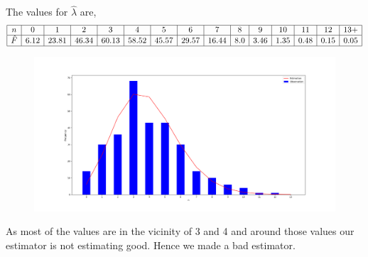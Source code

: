 \documentclass{article}
\theoremstyle{mytheoremstyle}
\theoremstyle{mytheoremstyle}
\theoremstyle{myproblemstyle}
\begin{document}
The values for \(\hat{\lambda}\) are,
\begin{equation*}
    \begin{array}{|c|c|c|c|c|c|c|c|c|c|c|c|c|c|c|}
        \hline
        n       & 0    & 1     & 2     & 3     & 4     & 5     & 6     & 7     & 8   & 9    & 10   & 11   & 12   & 13+  \\\hline
        \hat{F} & 6.12 & 23.81 & 46.34 & 60.13 & 58.52 & 45.57 & 29.57 & 16.44 & 8.0 & 3.46 & 1.35 & 0.48 & 0.15 & 0.05 \\\hline
    \end{array}
\end{equation*}
\begin{figure}[h]
    \center
    \includegraphics[width=\textwidth]{fig.png}
\end{figure}

As most of the values are in the vicinity of 3 and 4 and around those values our estimator is not estimating good. Hence we made a bad estimator.
\end{document}
